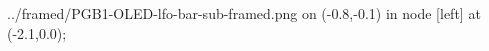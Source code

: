 \documentclass[preview]{standalone}
\begin{document}
\begin{zoomed}{../framed/PGB1-OLED-lfo-bar-sub-framed.png}
  \spy [gray, size=2.5cm] on (-0.8,-0.1) in node [left] at (-2.1,0.0);
\end{zoomed}
\end{document}
